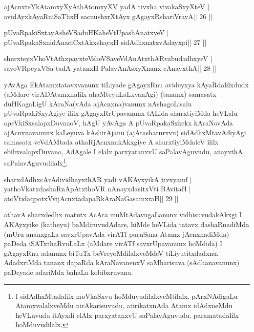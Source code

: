 
\begin{shl}
ajAcnxteYkAtamxyXyAthAtomxyXV yadA tivxha vivakaSxyXteV |
avidAyxkAyaRniSaThxH sacnushxrXtAyx gAgayxRshariVrayA\hfill || 26 ||
\end{shl}

\begin{shl}
pUvaRpakiSxtayA\s sheVSaduHKaheVtUpashAnatxyeV |
pUvaRpakaSxnidAnaciCxtAkxshayxH sidAdhxnatxvAdayxpi\hfill || 27 ||
\end{shl}

\begin{shl}
shurxteyxVhoVtAthxpayxteV\s sheVSaveVdAnAtxthARvabudadhxyeV |
savoVR\s peyxVSa tadA yatanxH PalavAnAsxyXnanx cAnayxthA\hfill || 28 ||
\end{shl}

\begin{artha}
yAvAga EkAtamxtatavxvanunx tiLiyade gAgayxRnu avideyxya kAyaRdalilxdudx (aMdare virADAtamxnalilx ahaMteyuLaLxvanAgi) (tananx) samasatx  duHKagaLigU kAraNa(vAda ajAcnxna)vanunx nAshagoLisalu pUvaRpakiSxyAgiye  ililx gAgayxRrUpavanunx tALida shurxtiyiMda heVLalu  apeVkiSxsalapxDuvanoV, hAgU yAvAga A pUvaRpakaSxkekx kAraNavAda ajAcnxnavanunx kaLeyuva kAshirAjanu (ajAtashaturxvu) sidAdhxMtavAdiyAgi samasatx veVdAMtada athaRjAcnxnakAkxgiye A shurxtiyiMdaleV ililx ebibxsalapxDuvano, AdAgale I elalx parxyatanxvU saPalavAguvudu, anayxthA saPalavAguvudilalx\footnote[2]{I sidAdhxMtadalilx moVkaSxvu hoMduvudilalxveMtilalx. pArxNAdigaLu AtamxvalalxveMdu nirAkarisuvudu, atirikatxnAda Atamx idAdxneMdu heVLuvudu itAyxdi elAlx parxyatanxvU saPalavAguvudu. paramatadalilx hoMduvudilalx.}.
\end{artha}

\begin{shl}
sharxdAdhxcArAdividhayxthAR yadi vA\s\s KAyxyikA tivxyamf |
yathoVkatxdashaRnApAtxthoVR nAnayxdasitxVti BAvitaH |
atoV\s tidaqpotxV\s vijAcnxtadapaRkAraNaGasamxraH\hfill || 29 ||
\end{shl}

\begin{artha}
athavA sharxdedhx matutx AcAra muMtAdavugaLanunx vidhisuvudakAkxgi I AKAyxyike (katheyu) baMdiruvudAdare, hiMde heVLida tatavx dashaRnadiMda (mUru ananxgaLa savxrUpavAda virATf puruSana Atamx jAcnxnadiMda) paDeda iSATxthaRvuLaLx (aMdare virATf savxrUpavanunx hoMdida) I gAgayxRnu adanunx biTuTx beVreyoMdilalxveMdeV tiLiyutitxdadxnu. AdadxriMda tananx dapaRda kAraNavanenxV saMharisuva (sAdhanavanunx) paDeyade adariMda bahaLa kobibxruvanu.
\end{artha}

